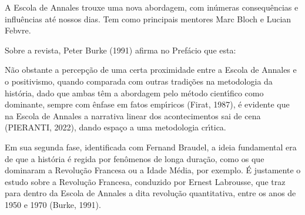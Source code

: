 \documentclass[
12pt,		%
openright,	%
twoside,  %
a4paper,			%
chapter=TITLE,		%
english,			%
french,				%
spanish,			%
brazil				%
]{USPSC-classe/USPSC}
\begin{document}
A Escola de Annales trouxe uma nova abordagem, com in\'umeras consequ\^encias e influ\^encias at\'e nossos dias. Tem como principais mentores  Marc Bloch e Lucian Febvre.









Sobre a revista, Peter Burke (1991) afirma no Pref\'acio que esta:










\noindent\begin{center}\mbox{\centering{}}\end{center}


N\~ao obstante a percep\c{c}\~ao de uma certa proximidade entre a Escola de Annales e o positivismo, quando comparada com outras tradi\c{c}\~oes na metodologia da hist\'oria, dado que ambas t\^em a abordagem pelo m\'etodo cient\'{\i}fico como dominante, sempre com \^enfase em fatos emp\'{\i}ricos (Firat, 1987), \'e evidente que na Escola de Annales a narrativa linear dos acontecimentos sai de cena (PIERANTI, 2022), dando espa\c{c}o a uma metodologia cr\'{\i}tica.









Em sua segunda fase, identificada com Fernand Braudel, a ideia fundamental era de que a hist\'oria \'e regida por fen\^omenos de longa dura\c{c}\~ao, como os que dominaram a Revolu\c{c}\~ao Francesa ou a Idade M\'edia, por exemplo. \'E justamente o estudo sobre a Revolu\c{c}\~ao Francesa, conduzido por Ernest Labrousse, que traz para dentro da Escola de Annales a dita \textquotedbl revolu\c{c}\~ao quantitativa\textquotedbl , entre os anos de 1950 e 1970  (Burke, 1991).
\end{document}
